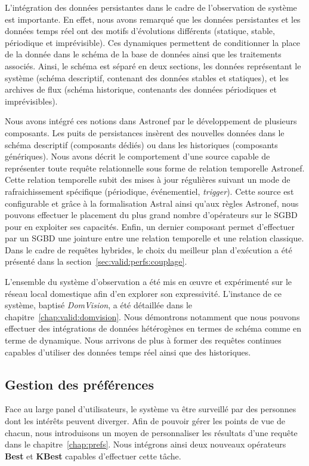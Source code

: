 L'intégration des données persistantes dans le cadre de l'observation de système est importante. En effet, nous avons remarqué que les données persistantes et les données temps réel ont des motifs d'évolutions différents (statique, stable, périodique et imprévisible). Ces dynamiques permettent de conditionner la place de la donnée dans le schéma de la base de données ainsi que les traitements associés. Ainsi, le schéma est séparé en deux sections, les données représentant le système (schéma descriptif, contenant des données stables et statiques), et les archives de flux (schéma historique, contenants des données périodiques et imprévisibles).

Nous avons intégré ces notions dans Astronef par le développement de plusieurs composants. Les puits de persistances insèrent des nouvelles données dans le schéma descriptif (composants dédiés) ou dans les historiques (composants génériques). Nous avons décrit le comportement d'une source capable de représenter toute requête relationnelle sous forme de relation temporelle Astronef. Cette relation temporelle subit des mises à jour régulières suivant un mode de rafraichissement spécifique (périodique, événementiel, \textit{trigger}). Cette source est configurable et grâce à la formalisation Astral ainsi qu'aux règles Astronef, nous pouvons effectuer le placement du plus grand nombre d'opérateurs sur le SGBD pour en exploiter ses capacités. Enfin, un dernier composant permet d'effectuer par un SGBD une jointure entre une relation temporelle et une relation classique. Dans le cadre de requêtes hybrides, le choix du meilleur plan d'exécution a été présenté dans la section~\ref{sec:valid:perfs:couplage}.

L'ensemble du système d'observation a été mis en œuvre et expérimenté sur le réseau local domestique afin d'en explorer son expressivité. L'instance de ce système, baptisé \textit{DomVision}, a été détaillée dans le chapitre~\ref{chap:valid:domvision}. Nous démontrons notamment que nous pouvons effectuer des intégrations de données hétérogènes en termes de schéma comme en terme de dynamique. Nous arrivons de plus à former des requêtes continues capables d'utiliser des données temps réel ainsi que des historiques.

\subsection{Gestion des préférences}
Face au large panel d'utilisateurs, le système va être surveillé par des personnes dont les intérêts peuvent diverger. Afin de pouvoir gérer les points de vue de chacun, nous introduisons un moyen de personnaliser les résultats d'une requête dans le chapitre~\ref{chap:prefs}. Nous intégrons ainsi deux nouveaux opérateurs \textbf{Best} et \textbf{KBest} capables d'effectuer cette tâche.

